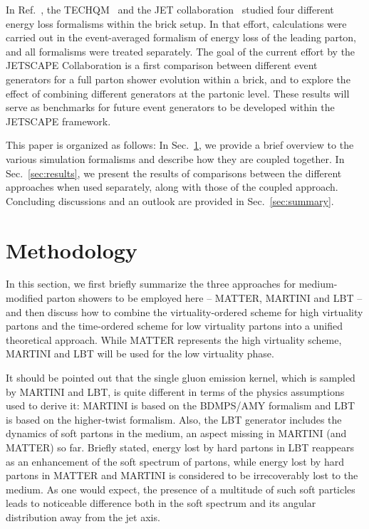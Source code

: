 \documentclass[aps,prc,twocolumn,floatfix,superscriptaddress,nofootinbib]{revtex4}
\begin{document}
In Ref.~\cite{Armesto:2011ht}, the TECHQM~\cite{techqm} and the JET collaboration~\cite{JET} studied four different energy loss formalisms within the brick setup. In that effort, calculations were carried out in the event-averaged formalism of energy loss of the leading parton, and all formalisms were treated separately. The goal of the current effort by the JETSCAPE Collaboration is a first comparison between different event generators for a full parton shower evolution within a brick, and to explore the effect of combining different generators at the partonic level. These results will serve as benchmarks for future event generators to be developed within the JETSCAPE framework. 

This paper is organized as follows: In Sec.~\ref{sec:methodology}, we provide a brief overview to the various simulation formalisms and describe how they are coupled together. In Sec.~\ref{sec:results}, we present the results of comparisons between the different approaches when used separately, along with those of the coupled approach. Concluding discussions and an outlook are provided in Sec.~\ref{sec:summary}.


\section{Methodology} 
\label{sec:methodology}

In this section, we first briefly summarize the three approaches for medium-modified parton showers to be employed here -- MATTER, MARTINI and LBT -- and then discuss how to combine the virtuality-ordered scheme for high virtuality partons and the time-ordered scheme for low virtuality partons into a unified theoretical approach. While MATTER represents the high virtuality scheme, MARTINI and LBT will be used for the low virtuality phase. 

It should be pointed out that the single gluon emission kernel, which is sampled by MARTINI and LBT, is quite different in terms of the physics assumptions used to derive it: MARTINI is based on the BDMPS/AMY formalism and LBT is based on the higher-twist formalism. Also, the LBT generator includes the dynamics of soft partons in the medium, an aspect missing in MARTINI (and MATTER) so far. Briefly stated, energy lost by hard partons in LBT reappears as an enhancement of the soft spectrum of partons, while energy lost by hard partons in MATTER and MARTINI is considered to be irrecoverably lost to the medium. As one would expect, the presence of a multitude of such soft particles leads to noticeable difference both in the soft spectrum and its angular distribution away from the jet axis. 
\end{document}
